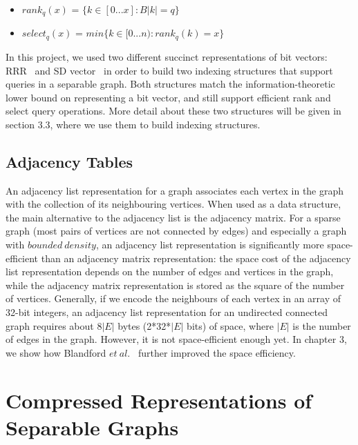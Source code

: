 \documentclass[12pt,glossary]{dalthesis}
\begin{document}
\begin{itemize}[noitemsep]
\item $rank_{q}(x)$ = $\{k \in [0...x] : B|k| = q \}$
\item $select_{q}(x)$ = $ min \{ k \in [0...n) : rank_{q}(k) = x \} $ 
\end{itemize}


In this project, we used two different succinct representations of bit vectors: RRR~\cite{RRR} and SD vector~\cite{SD-vector} in order to build two indexing structures that support queries in a separable graph. Both structures match the information-theoretic lower bound on representing a bit vector, and still support efficient rank and select query operations. More detail about these two structures will be given in section 3.3, where we use them to build indexing structures.

\bigskip
\bigskip
\section{Adjacency Tables}
An adjacency list representation for a graph associates each vertex in the graph with the collection of its neighbouring vertices. When used as a data structure, the main alternative to the adjacency list is the adjacency matrix. For a sparse graph (most pairs of vertices are not connected by edges) and especially a graph with $bounded \ density$, an adjacency list representation is significantly more space-efficient than an adjacency matrix representation: the space cost of the adjacency list representation depends on the number of edges and vertices in the graph, while the adjacency matrix representation is stored as the square of the number of vertices. Generally, if we encode the neighbours of each vertex in an array of 32-bit integers, an adjacency list representation for an undirected connected graph requires about 8$|E|$ bytes (2*32*$|E|$ bits) of space, where $|E|$ is the number of edges in the graph. However, it is not space-efficient enough yet. In chapter 3, we show how Blandford $et \ al.$~\cite{compact-representation} further improved the space efficiency.



\chapter{Compressed Representations of Separable Graphs}
\end{document}
